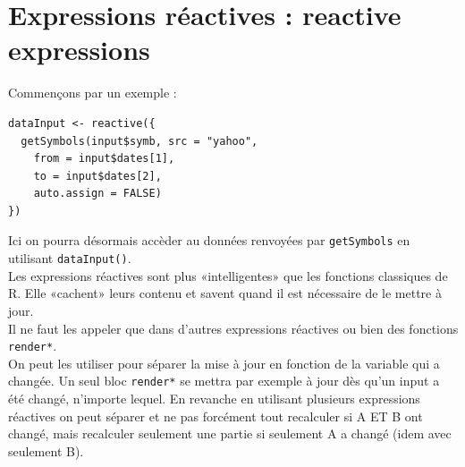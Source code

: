 \documentclass{article}
\begin{document}
\section{Expressions réactives : reactive expressions}
Commençons par un exemple :
\begin{verbatim}
dataInput <- reactive({
  getSymbols(input$symb, src = "yahoo", 
    from = input$dates[1],
    to = input$dates[2],
    auto.assign = FALSE)
})
\end{verbatim}
Ici on pourra désormais accèder au données renvoyées par \verb!getSymbols! en utilisant \verb!dataInput()!. \\
Les expressions réactives sont plus «intelligentes» que les fonctions classiques de R. Elle «cachent» leurs contenu et savent quand il est nécessaire de le mettre à jour. \\
Il ne faut les appeler que dans d'autres expressions réactives ou bien des fonctions \verb!render*!. \\
On peut les utiliser pour séparer la mise à jour en fonction de la variable qui a changée. Un seul bloc \verb!render*! se mettra par exemple à jour dès qu'un input a été changé, n'importe lequel. En revanche en utilisant plusieurs expressions réactives on peut séparer et ne pas forcément tout recalculer si A ET B ont changé, mais recalculer seulement une partie si seulement A a changé (idem avec seulement B).
\end{document}
